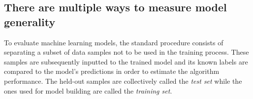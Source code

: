 
\subsection{There are multiple ways to measure model generality}
\label{sec:bipartite test sets}


To evaluate machine learning models, the standard procedure consists of separating a subset of data samples not to be used in the training process. These samples are subsequently inputted to the trained model and its known labels are compared to the model's predictions in order to estimate the algorithm performance. The held-out samples are collectively called the \emph{test set} while the ones used for model building are called the \emph{training set}.

